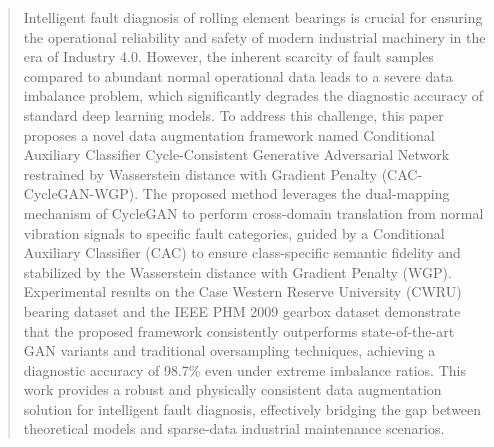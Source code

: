 \begin{abstract}
Intelligent fault diagnosis of rolling element bearings is crucial for ensuring the operational reliability and safety of modern industrial machinery in the era of Industry 4.0. However, the inherent scarcity of fault samples compared to abundant normal operational data leads to a severe data imbalance problem, which significantly degrades the diagnostic accuracy of standard deep learning models. To address this challenge, this paper proposes a novel data augmentation framework named Conditional Auxiliary Classifier Cycle-Consistent Generative Adversarial Network restrained by Wasserstein distance with Gradient Penalty (CAC-CycleGAN-WGP). The proposed method leverages the dual-mapping mechanism of CycleGAN to perform cross-domain translation from normal vibration signals to specific fault categories, guided by a Conditional Auxiliary Classifier (CAC) to ensure class-specific semantic fidelity and stabilized by the Wasserstein distance with Gradient Penalty (WGP). Experimental results on the Case Western Reserve University (CWRU) bearing dataset and the IEEE PHM 2009 gearbox dataset demonstrate that the proposed framework consistently outperforms state-of-the-art GAN variants and traditional oversampling techniques, achieving a diagnostic accuracy of 98.7\% even under extreme imbalance ratios. This work provides a robust and physically consistent data augmentation solution for intelligent fault diagnosis, effectively bridging the gap between theoretical models and sparse-data industrial maintenance scenarios.
\end{abstract}
